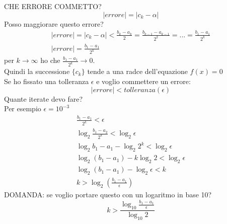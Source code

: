 \documentclass[a4paper, portrait]{book}
\numberwithin{equation}{chapter} %
\begin{document}
CHE ERRORE COMMETTO?
\begin{equation}
    |errore| = |c_k - \alpha|
\end{equation}
Posso maggiorare questo errore?
\begin{gather}
    |errore| = |c_k - \alpha| < \frac{b_k-a_k}{2} = \frac{b_{k-1}-a_{k-1}}{2^2} = ... = \frac{b_1 - a_1}{2^k}\\
    |errore| = \frac{b_1 - a_1}{2^k}
\end{gather}
per $k \rightarrow \infty$ ho che $\frac{b_1 - a_1}{2^k} \rightarrow 0$.\\
Quindi la successione $\{c_k\}$ tende a una radce dell'equazione $f(x) = 0$\\
Se ho fissato una tolleranza $\epsilon$ e voglio commettere un errore:
\begin{equation}
    |errore| < tolleranza (\epsilon)
\end{equation}
Quante iterate devo fare?\\
Per esempio $\epsilon = 10^{-3}$
\begin{gather}
    \frac{b_1 - a_1}{2^k} < \epsilon\\
    \log_2 \frac{b_1 - a_2}{2^k} < \log_2 \epsilon\\
    \log_2 b_1 - a_1 - \log_2 2^k < \log_2 \epsilon\\
    \log_2 (b_1 - a_1) - k \log_2 2 < \log_2 \epsilon\\
    \log_2(b_1 - a_1) - \log_2\epsilon < k\\
    k> \log_2 \left(\frac{b_1-a_1}{\epsilon}\right)
\end{gather}
DOMANDA: se voglio portare questo con un logaritmo in base 10?
\begin{equation}
    k > \frac{\log_{10}\frac{b_1 - a_1}{\epsilon}}{\log_{10}2}
\end{equation}
\end{document}
